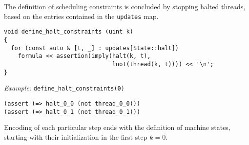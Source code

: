
%
%

\noindent
The definition of scheduling constraints is concluded by stopping halted threads, based on the entries contained in the \texttt{updates} map.

\begin{lstlisting}[style=c++]
void define_halt_constraints (uint k)
{
  for (const auto & [t, _] : updates[State::halt])
    formula << assertion(imply(halt(k, t),
                               lnot(thread(k, t)))) << '\n';
}
\end{lstlisting}


\noindent
\emph{Example:} \lstinline[style=c++]{define_halt_constraints(0)}

\begin{lstlisting}[language=SMTLib]
(assert (=> halt_0_0 (not thread_0_0)))
(assert (=> halt_0_1 (not thread_0_1)))
\end{lstlisting}


\noindent
Encoding of each particular step ends with the definition of machine states,
starting with their initialization in the first step $k = 0$.

